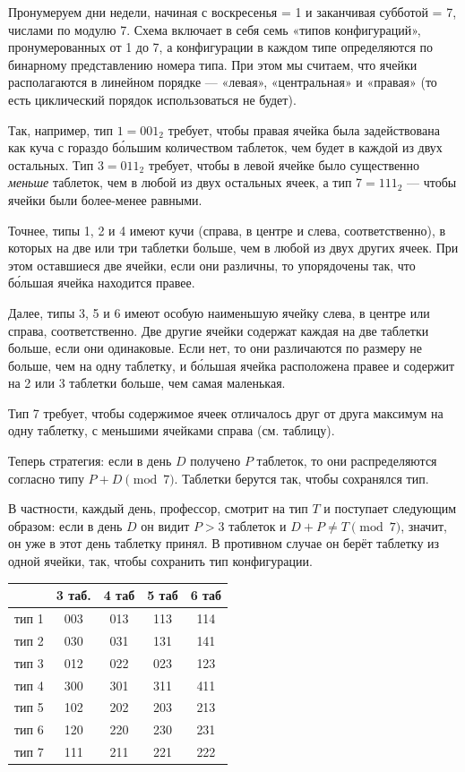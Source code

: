 Пронумеруем дни недели, начиная с воскресенья = 1 и заканчивая субботой = 7, числами по модулю 7.
Схема включает в себя семь «типов конфигураций», пронумерованных от 1 до 7, а конфигурации в каждом типе определяются по бинарному представлению номера типа.
При этом мы считаем, что ячейки располагаются в линейном порядке --- «левая», «центральная» и «правая» (то есть циклический порядок использоваться не будет).

Так, например, тип $1=001_2$ требует, чтобы правая ячейка была задействована как куча с гораздо б\'{о}льшим количеством таблеток, чем будет в каждой из двух остальных.
Тип $3 = 011_2$ требует, чтобы в левой ячейке было существенно \emph{меньше} таблеток, чем в любой из двух остальных ячеек,
а тип 7$ = 111_2$ --- чтобы ячейки были более-менее равными.

Точнее, типы 1, 2 и 4 имеют кучи (справа, в центре и слева, соответственно), в которых на две или три таблетки больше, чем в любой из двух других ячеек.
При этом оставшиеся две ячейки, если они различны, то упорядочены так, что б\'{о}льшая ячейка находится правее.

Далее, типы 3, 5 и 6 имеют особую наименьшую ячейку слева, в центре или справа, соответственно.
Две другие ячейки содержат каждая на две таблетки больше, если они одинаковые.
Если нет, то они различаются по размеру не больше, чем на одну таблетку, и б\'{о}льшая ячейка расположена правее и содержит на 2 или 3 таблетки больше, чем самая маленькая.

Тип 7 требует, чтобы содержимое ячеек отличалось друг от друга максимум на одну таблетку, с меньшими ячейками справа (см. таблицу).

Теперь стратегия: если в день $D$ получено $P$ таблеток, то они распределяются согласно типу $P+D \pmod 7$.
Таблетки берутся так, чтобы сохранялся тип.

В частности, каждый день, профессор, смотрит на тип $T$ и поступает следующим образом:
если в день $D$ он видит $P>3$ таблеток и $D+P\ne T\pmod 7$, значит, он уже в этот день таблетку принял.
В противном случае он берёт таблетку из одной ячейки, так, чтобы сохранить тип конфигурации.

\begin{center}
  \begin{tabular}{ l | c c c c }
     & 3 таб. & 4 таб & 5 таб & 6 таб \\ \hline
    тип 1 & 003 & 013 & 113 & 114 \\ 
    тип 2 & 030 & 031 & 131 & 141 \\ 
    тип 3 & 012 & 022 & 023 & 123\\ 
    тип 4 & 300 & 301 & 311 & 411\\ 
    тип 5 & 102 & 202 & 203 & 213\\ 
    тип 6 & 120 & 220 & 230 & 231\\ 
    тип 7 & 111 & 211 & 221 & 222
  \end{tabular}
\end{center}

